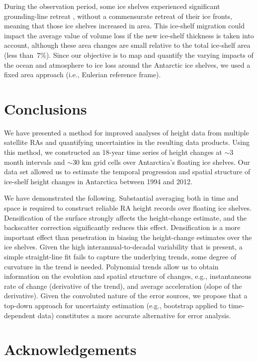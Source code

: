 During the observation period, some ice shelves experienced significant grounding-line retreat \parencite{Rignot2014}, without a commensurate retreat of their ice fronts, meaning that those ice shelves increased in area. This ice-shelf migration could impact the average value of volume loss if the new ice-shelf thickness is taken into account, although these area changes are small relative to the total ice-shelf area (less than~7\%). Since our objective is to map and quantify the varying impacts of the ocean and atmosphere to ice loss around the Antarctic ice shelves, we used a fixed area approach (i.e., Eulerian reference frame).

\section{Conclusions}

We have presented a method for improved analyses of height data from multiple satellite RAs and quantifying uncertainties in the resulting data products. Using this method, we constructed an 18-year time series of height changes at $\sim$3 month intervals and $\sim$30 km grid cells over Antarctica's floating ice shelves. Our data set allowed us to estimate the temporal progression and spatial structure of ice-shelf height changes in Antarctica between 1994 and 2012.

We have demonstrated the following. Substantial averaging both in time and space is required to construct reliable RA height records over floating ice shelves. Densification of the surface strongly affects the height-change estimate, and the backscatter correction significantly reduces this effect. Densification is a more important effect than penetration in biasing the height-change estimates over the ice shelves. Given the high interannual-to-decadal variability that is present, a simple straight-line fit fails to capture the underlying trends, some degree of curvature in the trend is needed. Polynomial trends allow us to obtain information on the evolution and spatial structure of changes, e.g., instantaneous rate of change (derivative of the trend), and average acceleration (slope of the derivative). Given the convoluted nature of the error sources, we propose that a top-down approach for uncertainty estimation (e.g., bootstrap applied to time-dependent data) constitutes a more accurate alternative for error analysis.

\clearpage
\section*{Acknowledgements}

